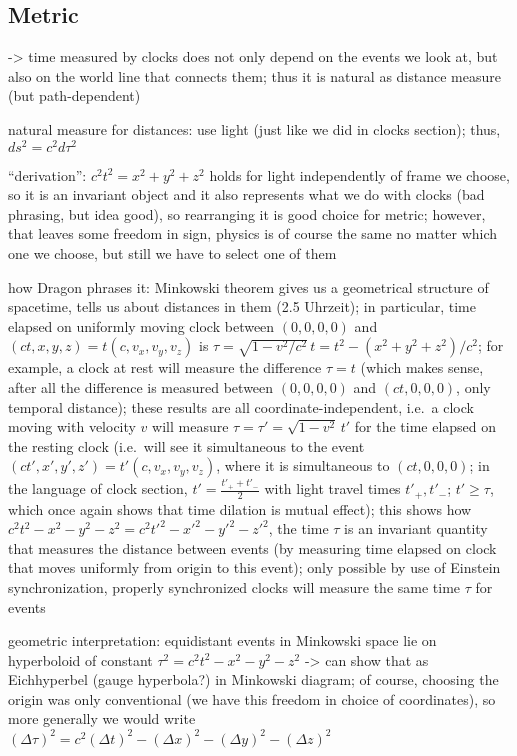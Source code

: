 		\subsection{Metric}
-> time measured by clocks does not only depend on the events we look at, but also on the world line that connects them; thus it is natural as distance measure (but path-dependent)



natural measure for distances: use light (just like we did in clocks section); thus, $ds^2 = c^2 d\tau^2$

\enquote{derivation}: $c^2 t^2 = x^2 + y^2 + z^2$ holds for light independently of frame we choose, so it is an invariant object and it also represents what we do with clocks (bad phrasing, but idea good), so rearranging it is good choice for metric; however, that leaves some freedom in sign, physics is of course the same no matter which one we choose, but still we have to select one of them


how Dragon phrases it: Minkowski theorem gives us a geometrical structure of spacetime, tells us about distances in them (2.5 Uhrzeit); in particular, time elapsed on uniformly moving clock between $(0, 0, 0, 0)$ and $(ct, x, y, z) = t (c, v_x, v_y, v_z)$ is $\tau = \sqrt{1 - v^2 / c^2} \, t = t^2 - (x^2 + y^2 + z^2) / c^2$; for example, a clock at rest will measure the difference $\tau = t$ (which makes sense, after all the difference is measured between $(0, 0, 0, 0)$ and $(ct, 0, 0, 0)$, only temporal distance); these results are all coordinate-independent, i.e.~a clock moving with velocity $v$ will measure $\tau = \tau' = \sqrt{1 - v^2} \, t'$ for the time elapsed on the resting clock (i.e.~will see it simultaneous to the event $(ct', x', y', z') = t' (c, v_x, v_y, v_z)$, where it is simultaneous to $(ct, 0, 0, 0)$; in the language of clock section, $t' = \frac{t'_+ + t'_-}{2}$ with light travel times $t'_+, t'_-$; $t' \geq \tau$, which once again shows that time dilation is mutual effect); this shows how $c^2 t^2 - x^2 - y^2 - z^2 = c^2 t'^2 - x'^2 - y'^2 - z'^2$, the time $\tau$ is an invariant quantity that measures the distance between events (by measuring time elapsed on clock that moves uniformly from origin to this event); only possible by use of Einstein synchronization, properly synchronized clocks will measure the same time $\tau$ for events



geometric interpretation: equidistant events in Minkowski space lie on hyperboloid of constant $\tau^2 = c^2 t^2 - x^2 - y^2 - z^2$ -> can show that as Eichhyperbel (gauge hyperbola?) in Minkowski diagram; of course, choosing the origin was only conventional (we have this freedom in choice of coordinates), so more generally we would write $(\Delta \tau)^2 = c^2 (\Delta t)^2 - (\Delta x)^2 - (\Delta y)^2 - (\Delta z)^2$

